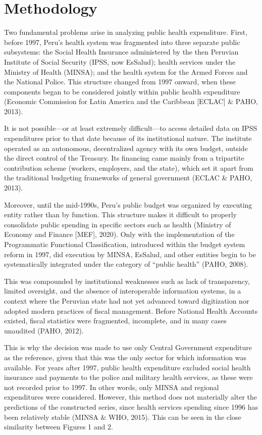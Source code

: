 \documentclass[12pt]{article}
\begin{document}
\bigskip
\bigskip
\bigskip
\bigskip
\bigskip
\bigskip
\bigskip
\bigskip
\bigskip
\bigskip
\bigskip
\bigskip
\bigskip
\bigskip
\section{Methodology}

Two fundamental problems arise in analyzing public health expenditure. First, before 1997, Peru’s health system was fragmented into three separate public subsystems: the Social Health Insurance administered by the then Peruvian Institute of Social Security (IPSS, now EsSalud); health services under the Ministry of Health (MINSA); and the health system for the Armed Forces and the National Police. This structure changed from 1997 onward, when these components began to be considered jointly within public health expenditure (Economic Commission for Latin America and the Caribbean [ECLAC] \& PAHO, 2013).

It is not possible—or at least extremely difficult—to access detailed data on IPSS expenditures prior to that date because of its institutional nature. The institute operated as an autonomous, decentralized agency with its own budget, outside the direct control of the Treasury. Its financing came mainly from a tripartite contribution scheme (workers, employers, and the state), which set it apart from the traditional budgeting frameworks of general government (ECLAC \& PAHO, 2013).

Moreover, until the mid-1990s, Peru’s public budget was organized by executing entity rather than by function. This structure makes it difficult to properly consolidate public spending in specific sectors such as health (Ministry of Economy and Finance [MEF], 2020). Only with the implementation of the Programmatic Functional Classification, introduced within the budget system reform in 1997, did execution by MINSA, EsSalud, and other entities begin to be systematically integrated under the category of “public health” (PAHO, 2008).

This was compounded by institutional weaknesses such as lack of transparency, limited oversight, and the absence of interoperable information systems, in a context where the Peruvian state had not yet advanced toward digitization nor adopted modern practices of fiscal management. Before National Health Accounts existed, fiscal statistics were fragmented, incomplete, and in many cases unaudited (PAHO, 2012).

This is why the decision was made to use only Central Government expenditure as the reference, given that this was the only sector for which information was available. For years after 1997, public health expenditure excluded social health insurance and payments to the police and military health services, as these were not recorded prior to 1997. In other words, only MINSA and regional expenditures were considered. However, this method does not materially alter the predictions of the constructed series, since health services spending since 1996 has been relatively stable (MINSA \& WHO, 2015). This can be seen in the close similarity between Figures 1 and 2.
\end{document}
